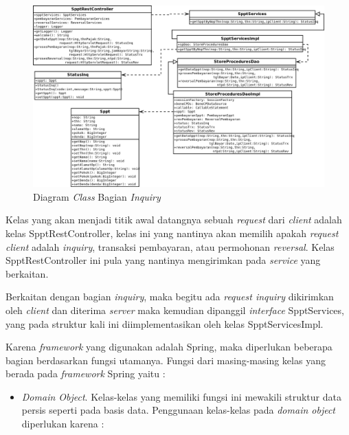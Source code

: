 \begin{enumerate}
  \begin{figure}[H]
    \centering
    \includegraphics[width=1\textwidth]{./resources/uml/uml-class-inquiry}
    \caption{Diagram \textit{Class} Bagian \textit{Inquiry}}
    \label{fig:uml-class-inquiry}
  \end{figure}
  
  Kelas yang akan menjadi titik awal datangnya sebuah \textit{request} dari \textit{client} adalah kelas SpptRestController, kelas ini yang nantinya akan memilih apakah \textit{request client} adalah \textit{inquiry}, transaksi pembayaran, atau permohonan \textit{reversal}. Kelas SpptRestController ini pula yang nantinya mengirimkan pada \textit{service} yang berkaitan.
  
  Berkaitan dengan bagian \textit{inquiry}, maka begitu ada \textit{request inquiry} dikirimkan oleh \textit{client} dan diterima \textit{server} maka kemudian dipanggil \textit{interface} SpptServices, yang pada struktur kali ini diimplementasikan oleh kelas SpptServicesImpl.
  
  Karena \textit{framework} yang digunakan adalah Spring, maka diperlukan beberapa bagian berdasarkan fungsi utamanya. Fungsi dari masing-masing kelas yang berada pada \textit{framework} Spring yaitu :
  
  \begin{itemize}
    \item \textit{Domain Object}. Kelas-kelas yang memiliki fungsi ini mewakili struktur data persis seperti pada basis data. Penggunaan kelas-kelas pada \textit{domain object} diperlukan karena :
    

\end{itemize}
\end{enumerate}
